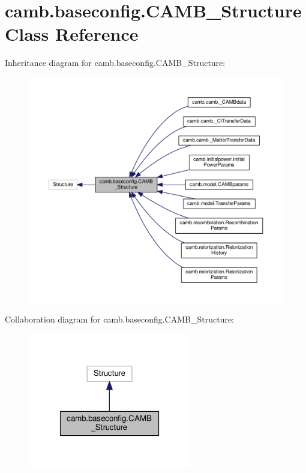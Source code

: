 \hypertarget{classcamb_1_1baseconfig_1_1CAMB__Structure}{}\section{camb.\+baseconfig.\+C\+A\+M\+B\+\_\+\+Structure Class Reference}
\label{classcamb_1_1baseconfig_1_1CAMB__Structure}


Inheritance diagram for camb.\+baseconfig.\+C\+A\+M\+B\+\_\+\+Structure\+:
\nopagebreak
\begin{figure}[H]
\begin{center}
\leavevmode
\includegraphics[width=350pt]{classcamb_1_1baseconfig_1_1CAMB__Structure__inherit__graph}
\end{center}
\end{figure}


Collaboration diagram for camb.\+baseconfig.\+C\+A\+M\+B\+\_\+\+Structure\+:
\nopagebreak
\begin{figure}[H]
\begin{center}
\leavevmode
\includegraphics[width=202pt]{classcamb_1_1baseconfig_1_1CAMB__Structure__coll__graph}
\end{center}
\end{figure}
